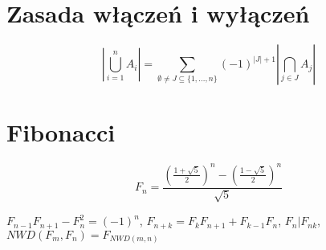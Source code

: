 \section{Zasada włączeń i wyłączeń}

$$| \bigcup_{i=1}^n A_i | = \sum_{\emptyset \neq J \subseteq  \{1,\dots,n\}} (-1)^{|J|+1} | \bigcap_{j \in J} A_j | $$

\section{Fibonacci}

$$F_n = \frac{\left(\frac{1+\sqrt{5}}{2}\right)^n - \left(\frac{1-\sqrt{5}}{2}\right)^n}{\sqrt{5}}$$

$F_{n-1}F_{n+1}-F_n^2=(-1)^n$, $F_{n+k}=F_k F_{n+1} + F_{k-1} F_n$, $F_n | F_{nk}$, $NWD(F_m, F_n) = F_{NWD(m, n)}$
